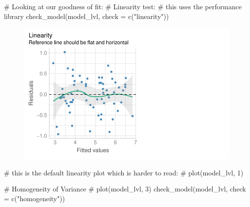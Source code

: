\documentclass[
  letterpaper,
  DIV=11,
  numbers=noendperiod]{scrartcl}
\newenvironment{Shaded}{\begin{snugshade}}{\end{snugshade}}
\newcommand{\AttributeTok}[1]{\textcolor[rgb]{0.40,0.45,0.13}{#1}}
\newcommand{\CommentTok}[1]{\textcolor[rgb]{0.37,0.37,0.37}{#1}}
\newcommand{\FunctionTok}[1]{\textcolor[rgb]{0.28,0.35,0.67}{#1}}
\newcommand{\NormalTok}[1]{\textcolor[rgb]{0.00,0.23,0.31}{#1}}
\newcommand{\StringTok}[1]{\textcolor[rgb]{0.13,0.47,0.30}{#1}}
\begin{document}
\begin{Shaded}
\begin{Highlighting}[]
\CommentTok{\# Looking at our goodness of fit:}
\CommentTok{\# Linearity test:}
\CommentTok{\# this uses the performance library}
\FunctionTok{check\_model}\NormalTok{(model\_lvl, }\AttributeTok{check =} \FunctionTok{c}\NormalTok{(}\StringTok{"linearity"}\NormalTok{))}
\end{Highlighting}
\end{Shaded}

\begin{figure}[H]

{\centering \includegraphics{sds-291_s-24_case-study-template_files/figure-pdf/unnamed-chunk-12-3.pdf}

}

\end{figure}

\begin{Shaded}
\begin{Highlighting}[]
\CommentTok{\# this is the default linearity plot which is harder to read:}
\CommentTok{\# plot(model\_lvl, 1)}

\CommentTok{\# Homogeneity of Variance}
\CommentTok{\# plot(model\_lvl, 3)}
\FunctionTok{check\_model}\NormalTok{(model\_lvl, }\AttributeTok{check =} \FunctionTok{c}\NormalTok{(}\StringTok{"homogeneity"}\NormalTok{))}
\end{Highlighting}
\end{Shaded}
\end{document}
